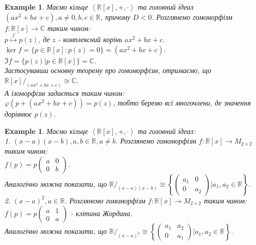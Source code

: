 \documentclass[a4paper, 10pt]{article}
\theoremstyle{theoremdd}
\theoremstyle{theoremdd}
\theoremstyle{theoremdd}
\theoremstyle{theoremdd}
\theoremstyle{theoremdd}
\newtheorem{example}[theorem]{Example}
\theoremstyle{theoremdd}
\theoremstyle{theoremdd}
\theoremstyle{theoremdd}
\theoremstyle{theoremdd}
\theoremstyle{theoremdd}
\theoremstyle{theoremdd}
\theoremstyle{theoremdd}
\theoremstyle{theoremdd}
\theoremstyle{theoremdd}
\theoremstyle{theoremdd}
\begin{document}
\begin{example}
Маємо кільце $\left< \mathbb{R}[x],+,\cdot \right>$ та головний ідеал \\ $(ax^2+bx+c), a \neq 0,b,c \in \mathbb{R}$, причому $D < 0$. Розглянемо гомоморфізм $f: \mathbb{R}[x] \to \mathbb{C}$ таким чином:\\
$p \overset{f}{\mapsto} p(z)$, де $z$ - комплексний корінь $ax^2+bx+c$.\\
$\ker f = \{ p \in \mathbb{R}[x]: p(z) = 0 \} = (ax^2+bx+c)$.\\
$\Im f = \{ p(z) | p \in \mathbb{R}[x] \} = \mathbb{C}$.\\
Застосувавши основну теорему про гомоморфізм, отримаємо, що \\ $\mathbb{R}[x]/_{(ax^2+bx+c)} \cong \mathbb{C}$.\\
А ізоморфізм задається таким чином:\\
$\varphi(p + (ax^2+bx+c)) = p(z)$, тобто беремо всі многочлени, де значення дорівнює $p(z)$.
\end{example}

\begin{example}
Маємо кільце $\left< \mathbb{R}[x],+,\cdot \right>$ та головний ідеал: \\ 
1. $(x-a)(x-b), a,b \in \mathbb{R}, a \neq b$. Розглянемо гомоморфізм $f: \mathbb{R}[x] \to M_{2 \times 2}$ таким чином:\\
$f(p) = p \begin{pmatrix}
a & 0 \\
0 & b
\end{pmatrix}$.\\
Аналогічно можна показати, що $\mathbb{R}/_{(x-a)(x-b)} \cong \left\{ \begin{pmatrix}
a_1 & 0 \\
0 & a_2
\end{pmatrix} | a_1,a_2 \in \mathbb{R} \right\}$.
\bigskip \\
2. $(x-a)^2, a \in \mathbb{R}$. Розглянемо гомоморфізм $f: \mathbb{R}[x] \to M_{2 \times 2}$ таким чином:\\
$f(p) = p \begin{pmatrix}
a & 1 \\
0 & a
\end{pmatrix}$ - клітина Жордана.\\
Аналогічно можна показати, що $\mathbb{R}/_{(x-a)^2} \cong \left\{ \begin{pmatrix}
a_1 & a_2 \\
0 & a_1
\end{pmatrix} | a_1,a_2 \in \mathbb{R} \right\}$.
\end{example}
\end{document}
